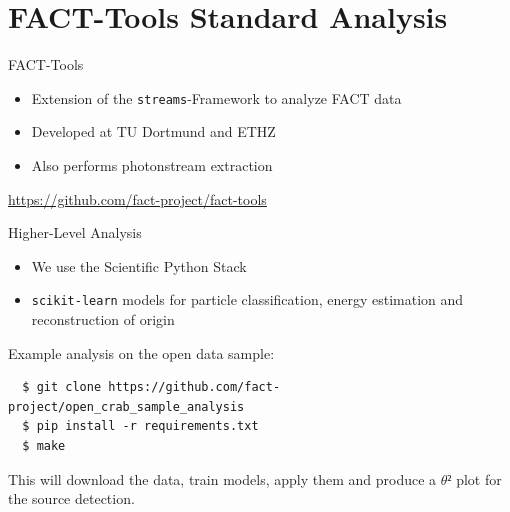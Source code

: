 \documentclass[compress, 9pt, aspectratio=1610, professionalfonts]{beamer}
\begin{document}
\section{FACT-Tools Standard Analysis}
\begin{frame}[t]{FACT-Tools}
  \begin{itemize}
    \item Extension of the \texttt{streams}-Framework to analyze FACT data
    \item Developed at TU Dortmund and ETHZ
    \item Also performs photonstream extraction
  \end{itemize}

  \vspace{0.25cm}
  \begin{center}
    \Large\url{https://github.com/fact-project/fact-tools}
  \end{center}

  \vspace{0.25cm}
  \begin{center}
    \begin{tikzpicture}[scale=1, transform shape]
      
    \end{tikzpicture}
  \end{center}
\end{frame}

\begin{frame}[c, fragile]{Higher-Level Analysis}
  \begin{itemize}
    \item We use the Scientific Python Stack
    \item \texttt{scikit-learn} models for particle classification, energy estimation and reconstruction of origin
  \end{itemize}

  \vspace{0.25cm}
  
  Example analysis on the open data sample:

  \begin{verbatim}
  $ git clone https://github.com/fact-project/open_crab_sample_analysis
  $ pip install -r requirements.txt
  $ make
  \end{verbatim}

  This will download the data, train models, apply them and produce a $θ²$ plot for the source detection.

\end{frame}
\end{document}
